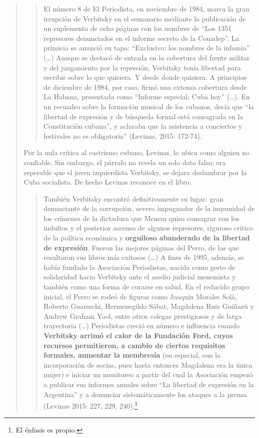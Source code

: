\begin{quote}
\begin{quote}
	El número 8 de El Periodista, en noviembre de 1984, marca la gran irrupción de Verbitsky en el semanario mediante la publicación de un suplemento de ocho páginas con los nombres de \enquote{Los 1351 represores denunciados en el informe secreto de la Conadep}. La primicia se anunció en tapa: \enquote{Exclusivo: los nombres de la infamia} (\dots) Aunque se destacó de entrada en la cobertura del frente militar y del juzgamiento por la represión, Verbitsky tenía libertad para escribir sobre lo que quisiera. Y desde donde quisiera. A principios de diciembre de 1984, por caso, firmó una extensa cobertura desde La Habana, presentada como \enquote{Informe especial: Cuba hoy} (\dots). En un recuadro sobre la formación musical de los cubanos, decía que \enquote{la libertad de expresión y de búsqueda formal está consagrada en la Constitución cubana}, y aclaraba que la asistencia a conciertos y festivales no es obligatoria'' (Levinas, 2015: 172-74).
\end{quote}


Por la nula crítica al castrismo cubano, Levinas, lo ubica como alguien no confiable. Sin embargo, el párrafo no revela un solo dato falso; era esperable que el joven izquierdista Verbitsky, se dejara deslumbrar por la Cuba socialista. De hecho Levinas reconoce en el libro:

\begin{quote}
	También Verbitsky encontró definitivamente su lugar: gran denunciante de la corrupción, severo impugnador de la impunidad de los crímenes de la dictadura que Menem quiso consagrar con los indultos y el posterior ascenso de algunos represores, riguroso crítico de la política económica y \textbf{orgulloso abanderado de la libertad de expresión}. Fueron las mejores páginas del Perro, de las que resultaron sus libros más exitosos (\dots) A fines de 1995, además, se había fundado la Asociación Periodistas, nacida como gesto de solidaridad hacia Verbitsky ante el asedio judicial menemista y también como una forma de curarse en salud. En el reducido grupo inicial, el Perro se rodeó de figuras como Joaquín Morales Solá, Roberto Guareschi, Hermenegildo Sábat, Magdalena Ruiz Guiñazú y Andrew Graham Yool, entre otros colegas prestigiosos y de larga trayectoria (\dots) Periodistas creció en número e influencia cuando \textbf{Verbitsky arrimó el calor de la Fundación Ford, cuyos recursos permitieron, a cambio de ciertos requisitos formales, aumentar la membresía} (en especial, con la incorporación de socias, pues hasta entonces Magdalena era la única mujer) e iniciar un monitoreo a partir del cual la Asociación empezó a publicar sus informes anuales sobre \enquote{La libertad de expresión en la Argentina} y a denunciar sistemáticamente los ataques a la prensa (Levinas 2015: 227, 229, 240).\footnote{El énfasis es propio.}
\end{quote}



\end{quote}
